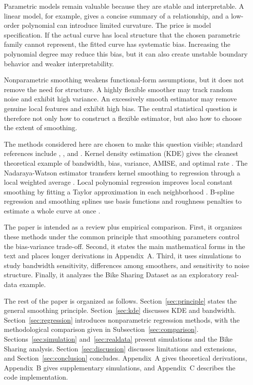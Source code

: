 \documentclass[12pt,a4paper]{article}
\begin{document}
Parametric models remain valuable because they are stable and interpretable. A linear model, for example, gives a concise summary of a relationship, and a low-order polynomial can introduce limited curvature. The price is model specification. If the actual curve has local structure that the chosen parametric family cannot represent, the fitted curve has systematic bias. Increasing the polynomial degree may reduce this bias, but it can also create unstable boundary behavior and weaker interpretability.

Nonparametric smoothing weakens functional-form assumptions, but it does not remove the need for structure. A highly flexible smoother may track random noise and exhibit high variance. An excessively smooth estimator may remove genuine local features and exhibit high bias. The central statistical question is therefore not only how to construct a flexible estimator, but also how to choose the extent of smoothing.

The methods considered here are chosen to make this question visible; standard references include \citet{hardle1990applied}, \citet{wasserman2006all}, and \citet{tsybakov2009introduction}. Kernel density estimation (KDE) gives the cleanest theoretical example of bandwidth, bias, variance, AMISE, and optimal rate \citep{rosenblatt1956remarks,parzen1962estimation,silverman1986density,wand1995kernel}. The Nadaraya-Watson estimator transfers kernel smoothing to regression through a local weighted average \citep{nadaraya1964estimating,watson1964smooth}. Local polynomial regression improves local constant smoothing by fitting a Taylor approximation in each neighborhood \citep{fan1996local}. B-spline regression and smoothing splines use basis functions and roughness penalties to estimate a whole curve at once \citep{deboor2001practical,eilers1996flexible,craven1979smoothing,wahba1990spline,green1994nonparametric}.

The paper is intended as a review plus empirical comparison. First, it organizes these methods under the common principle that smoothing parameters control the bias-variance trade-off. Second, it states the main mathematical forms in the text and places longer derivations in Appendix~A. Third, it uses simulations to study bandwidth sensitivity, differences among smoothers, and sensitivity to noise structure. Finally, it analyzes the Bike Sharing Dataset \citep{fanaee2014event} as an exploratory real-data example.

The rest of the paper is organized as follows. Section~\ref{sec:principle} states the general smoothing principle. Section~\ref{sec:kde} discusses KDE and bandwidth. Section~\ref{sec:regression} introduces nonparametric regression methods, with the methodological comparison given in Subsection~\ref{sec:comparison}. Sections~\ref{sec:simulation} and~\ref{sec:realdata} present simulations and the Bike Sharing analysis. Section~\ref{sec:discussion} discusses limitations and extensions, and Section~\ref{sec:conclusion} concludes. Appendix~A gives theoretical derivations, Appendix~B gives supplementary simulations, and Appendix~C describes the code implementation.
\end{document}
